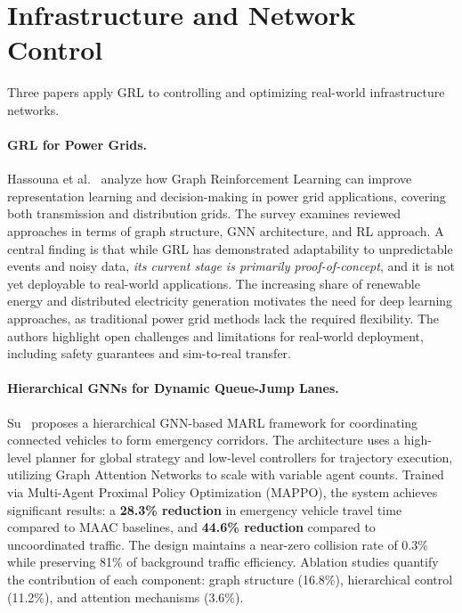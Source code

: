 \documentclass{article}
\begin{document}
\section{Infrastructure and Network Control}
\label{sec:infra}

Three papers apply GRL to controlling and optimizing real-world infrastructure networks.

\paragraph{GRL for Power Grids.}
Hassouna et al.~\cite{powergrid2025} analyze how Graph Reinforcement Learning can improve representation learning and decision-making in power grid applications, covering both transmission and distribution grids. The survey examines reviewed approaches in terms of graph structure, GNN architecture, and RL approach. A central finding is that while GRL has demonstrated adaptability to unpredictable events and noisy data, \textit{its current stage is primarily proof-of-concept}, and it is not yet deployable to real-world applications. The increasing share of renewable energy and distributed electricity generation motivates the need for deep learning approaches, as traditional power grid methods lack the required flexibility. The authors highlight open challenges and limitations for real-world deployment, including safety guarantees and sim-to-real transfer.

\paragraph{Hierarchical GNNs for Dynamic Queue-Jump Lanes.}
Su~\cite{qjl2026} proposes a hierarchical GNN-based MARL framework for coordinating connected vehicles to form emergency corridors. The architecture uses a high-level planner for global strategy and low-level controllers for trajectory execution, utilizing Graph Attention Networks to scale with variable agent counts. Trained via Multi-Agent Proximal Policy Optimization (MAPPO), the system achieves significant results: a \textbf{28.3\% reduction} in emergency vehicle travel time compared to MAAC baselines, and \textbf{44.6\% reduction} compared to uncoordinated traffic. The design maintains a near-zero collision rate of 0.3\% while preserving 81\% of background traffic efficiency. Ablation studies quantify the contribution of each component: graph structure (16.8\%), hierarchical control (11.2\%), and attention mechanisms (3.6\%).
\end{document}

